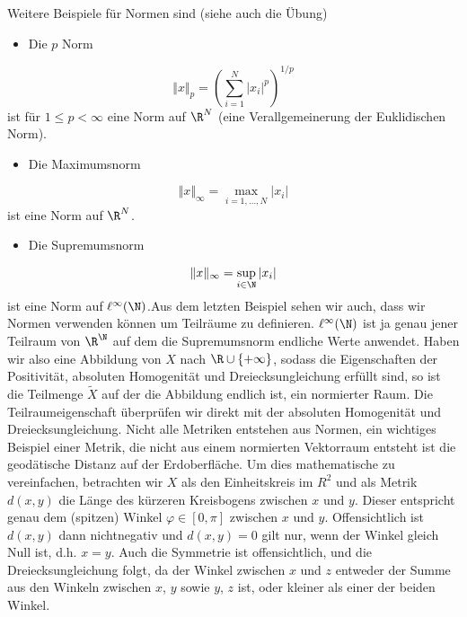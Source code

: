 \documentclass[letterpaper,10pt,english]{jupyterBook}
\begin{document}
Weitere Beispiele für Normen sind (siehe auch die Übung)
\begin{itemize}
\item {} 
Die \(p\) Norm

\end{itemize}
\begin{equation*}
 \Vert x \Vert_p = \left( \sum_{i=1}^N |x_i|^p \right)^{1/p}
\end{equation*}
ist für \(1 \leq p < \infty\) eine Norm auf \(\R^N\) (eine Verallgemeinerung der Euklidischen Norm).
\begin{itemize}
\item {} 
Die Maximumsnorm

\end{itemize}
\begin{equation*}
 \Vert x \Vert_\infty = \max_{i=1,\ldots,N} |x_i|
\end{equation*}
ist eine Norm auf \(\R^N\).
\begin{itemize}
\item {} 
Die Supremumsnorm

\end{itemize}
\begin{equation*}
 \Vert x \Vert_\infty = \sup_{i \in \N} |x_i|
\end{equation*}
ist eine Norm auf \(\ell^\infty(\N)\).Aus dem letzten Beispiel sehen wir auch, dass wir Normen verwenden können um Teilräume zu definieren. \(\ell^\infty(\N)\) ist ja genau jener Teilraum von \(\R^\N\) auf dem die Supremumsnorm endliche Werte anwendet. Haben wir also eine Abbildung von \(X  \) nach \(\R \cup \{+ \infty\}\), sodass die Eigenschaften der Positivität, absoluten Homogenität und Dreiecksungleichung erfüllt sind, so ist die Teilmenge \(\tilde X\) auf der die Abbildung endlich ist, ein normierter Raum. Die Teilraumeigenschaft überprüfen wir direkt mit der absoluten Homogenität und Dreiecksungleichung.
Nicht alle Metriken entstehen aus Normen, ein wichtiges Beispiel einer Metrik, die nicht aus einem normierten Vektorraum entsteht ist die geodätische Distanz auf der Erdoberfläche. Um dies mathematische zu vereinfachen, betrachten wir \(X\) als den Einheitskreis im \(R^2\) und als Metrik \(d(x,y)\) die Länge des kürzeren Kreisbogens zwischen \(x\) und \(y\). Dieser entspricht genau dem (spitzen) Winkel \(\varphi \in [0,\pi]\) zwischen \(x\) und \(y\). Offensichtlich ist \(d(x,y)\) dann nichtnegativ und \(d(x,y)=0\) gilt nur, wenn der Winkel gleich Null ist, d.h. \(x =y\). Auch die Symmetrie ist offensichtlich, und die Dreiecksungleichung folgt, da der Winkel zwischen \(x\) und \(z\) entweder der Summe aus den Winkeln zwischen \(x\), \(y\) sowie \(y\), \(z\) ist, oder kleiner als einer der beiden Winkel.
\end{document}
